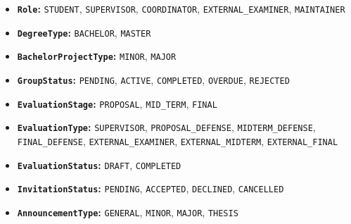 \documentclass[12pt,a4paper]{report}
\begin{document}
\begin{itemize}
  \item \textbf{\texttt{Role}:} \texttt{STUDENT}, \texttt{SUPERVISOR}, \texttt{COORDINATOR}, \texttt{EXTERNAL\_EXAMINER}, \texttt{MAINTAINER}
  \item \textbf{\texttt{DegreeType}:} \texttt{BACHELOR}, \texttt{MASTER}
  \item \textbf{\texttt{BachelorProjectType}:} \texttt{MINOR}, \texttt{MAJOR}
  \item \textbf{\texttt{GroupStatus}:} \texttt{PENDING}, \texttt{ACTIVE}, \texttt{COMPLETED}, \texttt{OVERDUE}, \texttt{REJECTED}
  \item \textbf{\texttt{EvaluationStage}:} \texttt{PROPOSAL}, \texttt{MID\_TERM}, \texttt{FINAL}
  \item \textbf{\texttt{EvaluationType}:} \texttt{SUPERVISOR}, \texttt{PROPOSAL\_DEFENSE}, \texttt{MIDTERM\_DEFENSE}, \texttt{FINAL\_DEFENSE}, \texttt{EXTERNAL\_EXAMINER}, \texttt{EXTERNAL\_MIDTERM}, \texttt{EXTERNAL\_FINAL}
  \item \textbf{\texttt{EvaluationStatus}:} \texttt{DRAFT}, \texttt{COMPLETED}
  \item \textbf{\texttt{InvitationStatus}:} \texttt{PENDING}, \texttt{ACCEPTED}, \texttt{DECLINED}, \texttt{CANCELLED}
  \item \textbf{\texttt{AnnouncementType}:} \texttt{GENERAL}, \texttt{MINOR}, \texttt{MAJOR}, \texttt{THESIS}
\end{itemize}
\end{document}
